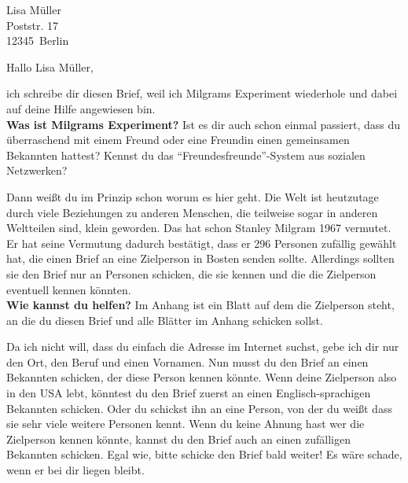 \documentclass[a4paper, 12pt, KOMAold, sections]{scrlttr2}
\newcommand{\Empfaenger}{Lisa Müller} %
\newcommand{\EStrasse}{Poststr. 17}   %
\newcommand{\EPLZ}{12345}             %
\newcommand{\EOrt}{Berlin}            %
\newcommand{\DocTitle}{Milgrams Small World Experiment} %
\newcommand{\section}[1]{\noindent\textbf{#1}\newline}
\begin{document}
    \begin{letter}{\Empfaenger \\ \EStrasse \\ \EPLZ~\EOrt}
    \date{\today}%
    \subject{\DocTitle}
    \opening{Hallo \Empfaenger,}
    ich schreibe dir diesen Brief, weil ich Milgrams Experiment wiederhole und
    dabei auf deine Hilfe angewiesen bin.\\

    \section{Was ist Milgrams Experiment?}
    Ist es dir auch schon einmal passiert, dass du überraschend mit einem Freund 
    oder eine Freundin einen gemeinsamen Bekannten hattest? Kennst du
    das "`Freundesfreunde"'-System aus sozialen Netzwerken?

    Dann weißt du im Prinzip schon worum es hier geht. Die Welt ist heutzutage
    durch viele Beziehungen zu anderen Menschen, die teilweise sogar in anderen
    Weltteilen sind, klein geworden. Das hat schon Stanley Milgram 1967 vermutet.
    Er hat seine Vermutung dadurch bestätigt, dass er 296  Personen zufällig
    gewählt hat, die einen Brief an eine Zielperson in Bosten senden sollte.
    Allerdings sollten sie den Brief nur an Personen schicken, die sie kennen
    und die die Zielperson eventuell kennen könnten.\\

    \section{Wie kannst du helfen?}
    Im Anhang ist ein Blatt auf dem die Zielperson steht, an die du diesen Brief
    und alle Blätter im Anhang schicken sollst. 

    Da ich nicht will, dass du einfach die Adresse im Internet
    suchst, gebe ich dir nur den Ort, den Beruf und einen Vornamen. Nun musst 
    du den Brief an einen Bekannten schicken, der diese Person kennen könnte.
    Wenn deine Zielperson also in den USA lebt, könntest du den Brief zuerst
    an einen Englisch-sprachigen Bekannten schicken. Oder du schickst ihn an
    eine Person, von der du weißt dass sie sehr viele weitere Personen kennt.
    Wenn du keine Ahnung hast wer die Zielperson kennen könnte, kannst du den
    Brief auch an einen zufälligen Bekannten schicken. Egal wie, bitte schicke
    den Brief bald weiter! Es wäre schade, wenn er bei dir liegen bleibt.\\


\end{letter}
\end{document}
